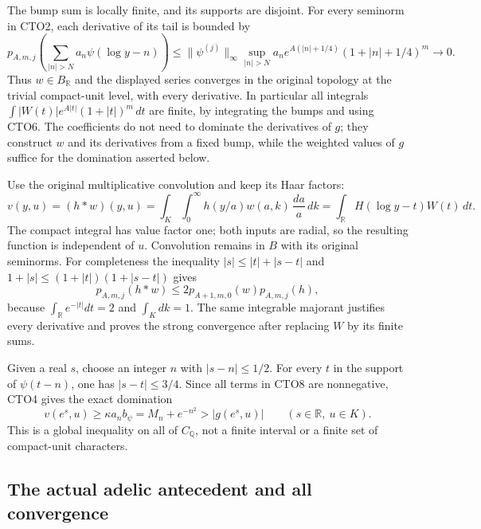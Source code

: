 The bump sum is locally finite, and its supports are disjoint.
For every seminorm in CTO2, each derivative of its tail is bounded by
\begin{equation}\tag{CTO7}
p_{A,m,j}\left(\sum_{|n|>N}a_n\psi(\log y-n)\right)
\le\|\psi^{(j)}\|_\infty
\sup_{|n|>N}a_n e^{A(|n|+1/4)}(1+|n|+1/4)^m
\longrightarrow0.
\end{equation}
Thus $w\in B_{\mathbb R}$ and the displayed series converges in
the original topology at the trivial compact-unit level, with every
derivative. In particular all integrals
$\int|W(t)|e^{A|t|}(1+|t|)^m\,dt$ are finite, by integrating
the bumps and using CTO6. The coefficients do not need to dominate
the derivatives of $g$; they construct $w$ and its derivatives
from a fixed bump, while the weighted values of $g$ suffice for
the domination asserted below.

Use the original multiplicative convolution and keep its Haar factors:
\begin{equation}\tag{CTO8}
v(y,u)=(h*w)(y,u)
 =\int_K\int_0^\infty h(y/a)w(a,k)\,\frac{da}{a}\,dk
 =\int_{\mathbb R}H(\log y-t)W(t)\,dt.
\end{equation}
The compact integral has value factor one; both inputs are radial,
so the resulting function is independent of $u$.
Convolution remains in $B$ with its original seminorms. For
completeness the inequality
$|s|\le|t|+|s-t|$ and
$1+|s|\le(1+|t|)(1+|s-t|)$ gives
\[
p_{A,m,j}(h*w)
 \le2p_{A+1,m,0}(w)p_{A,m,j}(h),
\]
because $\int_{\mathbb R}e^{-|t|}dt=2$ and $\int_Kdk=1$.
The same integrable majorant justifies every derivative and proves
the strong convergence after replacing $W$ by its finite sums.

Given a real $s$, choose an integer $n$ with $|s-n|\le1/2$.
For every $t$ in the support of $\psi(t-n)$, one has
$|s-t|\le3/4$. Since all terms in CTO8 are nonnegative,
CTO4 gives the exact domination
\begin{equation}\tag{CTO9}
v(e^s,u)\ge\kappa a_n b_\psi
 =M_n+e^{-n^2}>|g(e^s,u)|
\qquad(s\in\mathbb R,\ u\in K).
\end{equation}
This is a global inequality on all of $C_{\mathbb Q}$, not a
finite interval or a finite set of compact-unit characters.

\subsection{The actual adelic antecedent and all convergence}

